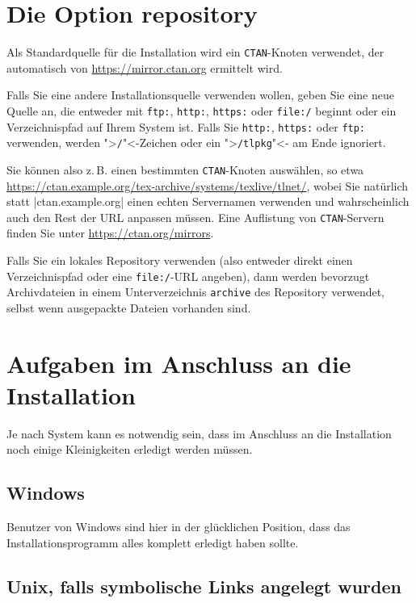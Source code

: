 \documentclass[12pt,ngerman,a4paper,fullparskip]{report}
\newcommand{\acro}[1]{\texttt{#1}}
\newcommand{\dirname}[1]{\texttt{#1}}
\providecommand*{\CTAN}{\acro{CTAN}\xspace}
\begin{document}
\section{Die Option repository}\label{sec:location}


Als Standardquelle für die Installation wird ein \CTAN-Knoten verwendet, der automatisch von \url{https://mirror.ctan.org} ermittelt wird.

Falls Sie eine andere Installationsquelle verwenden wollen, geben Sie eine neue Quelle an, die entweder mit \texttt{ftp:}, \texttt{http:}, \texttt{https:} oder \texttt{file:/} beginnt oder ein Verzeichnispfad auf Ihrem System ist.
Falls Sie \texttt{http:}, \texttt{https:} oder \texttt{ftp:} verwenden, werden ">\texttt{/}"<-Zeichen oder ein ">\texttt{/tlpkg}"<- am Ende ignoriert.

Sie können also z.\,B. einen bestimmten \CTAN-Knoten auswählen, so etwa
\url{https://ctan.example.org/tex-archive/systems/texlive/tlnet/},
wobei Sie natürlich statt |ctan.example.org| einen echten Servernamen
verwenden und wahrscheinlich auch den Rest der URL anpassen müssen.
Eine Auflistung von \CTAN-Servern finden Sie unter \url{https://ctan.org/mirrors}.

Falls Sie ein lokales Repository verwenden (also entweder direkt einen
Verzeichnispfad oder eine \texttt{file:/}-URL angeben), dann werden
bevorzugt Archivdateien in einem Unterverzeichnis \dirname{archive} des
Repository verwendet, selbst wenn ausgepackte Dateien vorhanden sind.

\section{Aufgaben im Anschluss an die Installation}\label{sec:postinstall}

Je nach System kann es notwendig sein, dass im Anschluss an die Installation noch einige Kleinigkeiten erledigt werden müssen.

\subsection{Windows}

Benutzer von Windows sind hier in der glücklichen Position, dass das Installationsprogramm alles komplett erledigt haben sollte.

\subsection{Unix, falls symbolische Links angelegt wurden}
\end{document}
